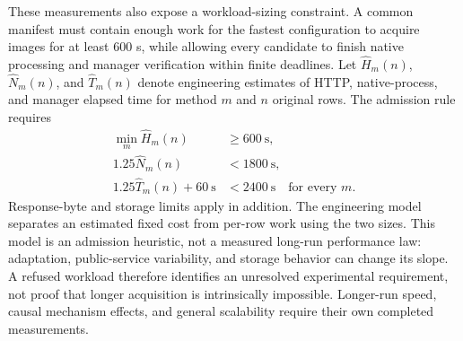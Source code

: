 These measurements also expose a workload-sizing constraint. A common manifest must contain enough work for the fastest configuration to acquire images for at least 600 s, while allowing every candidate to finish native processing and manager verification within finite deadlines. Let $\widehat H_m(n)$, $\widehat N_m(n)$, and $\widehat T_m(n)$ denote engineering estimates of HTTP, native-process, and manager elapsed time for method $m$ and $n$ original rows. The admission rule requires
\begin{align}
\min_m\widehat H_m(n)&\geq600\ \mathrm{s},\nonumber\\
1.25\widehat N_m(n)&<1800\ \mathrm{s},\nonumber\\
1.25\widehat T_m(n)+60\ \mathrm{s}&<2400\ \mathrm{s}
\quad\text{for every }m.
\label{eq:workload-admission}
\end{align}
Response-byte and storage limits apply in addition. The engineering model separates an estimated fixed cost from per-row work using the two sizes. This model is an admission heuristic, not a measured long-run performance law: adaptation, public-service variability, and storage behavior can change its slope. A refused workload therefore identifies an unresolved experimental requirement, not proof that longer acquisition is intrinsically impossible. Longer-run speed, causal mechanism effects, and general scalability require their own completed measurements.
